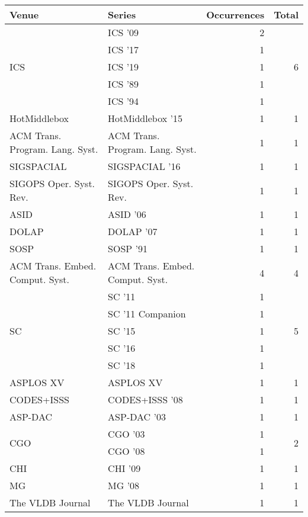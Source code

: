 \begin{table*}[t]
\begin{tabular}{llrr}
Venue & Series & Occurrences & Total\\\hline
\multirow{5}{*}{ICS } & ICS '09 & 2 & \multirow{5}{*}{6}\\
& ICS '17 & 1 &\\
& ICS '19 & 1 &\\
& ICS '89 & 1 &\\
& ICS '94 & 1 &\\
\multirow{1}{*}{HotMiddlebox } & HotMiddlebox '15 & 1 & \multirow{1}{*}{1}\\
\multirow{1}{*}{ACM Trans. Program. Lang. Syst.} & ACM Trans. Program. Lang. Syst. & 1 & \multirow{1}{*}{1}\\
\multirow{1}{*}{SIGSPACIAL } & SIGSPACIAL '16 & 1 & \multirow{1}{*}{1}\\
\multirow{1}{*}{SIGOPS Oper. Syst. Rev.} & SIGOPS Oper. Syst. Rev. & 1 & \multirow{1}{*}{1}\\
\multirow{1}{*}{ASID } & ASID '06 & 1 & \multirow{1}{*}{1}\\
\multirow{1}{*}{DOLAP } & DOLAP '07 & 1 & \multirow{1}{*}{1}\\
\multirow{1}{*}{SOSP } & SOSP '91 & 1 & \multirow{1}{*}{1}\\
\multirow{1}{*}{ACM Trans. Embed. Comput. Syst.} & ACM Trans. Embed. Comput. Syst. & 4 & \multirow{1}{*}{4}\\
\multirow{5}{*}{SC } & SC '11 & 1 & \multirow{5}{*}{5}\\
& SC '11 Companion & 1 &\\
& SC '15 & 1 &\\
& SC '16 & 1 &\\
& SC '18 & 1 &\\
\multirow{1}{*}{ASPLOS XV} & ASPLOS XV & 1 & \multirow{1}{*}{1}\\
\multirow{1}{*}{CODES+ISSS } & CODES+ISSS '08 & 1 & \multirow{1}{*}{1}\\
\multirow{1}{*}{ASP-DAC } & ASP-DAC '03 & 1 & \multirow{1}{*}{1}\\
\multirow{2}{*}{CGO } & CGO '03 & 1 & \multirow{2}{*}{2}\\
& CGO '08 & 1 &\\
\multirow{1}{*}{CHI } & CHI '09 & 1 & \multirow{1}{*}{1}\\
\multirow{1}{*}{MG } & MG '08 & 1 & \multirow{1}{*}{1}\\
\multirow{1}{*}{The VLDB Journal} & The VLDB Journal & 1 & \multirow{1}{*}{1}\\

\end{tabular}
\end{table*}
